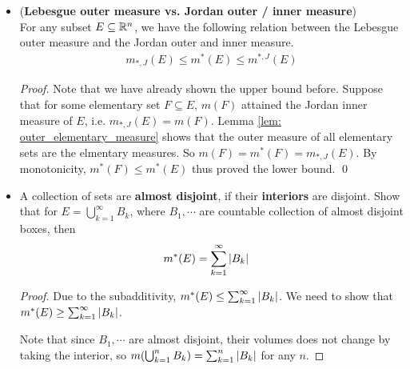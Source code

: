 \documentclass[11pt]{article}
\begin{document}
\begin{itemize}
\begin{proof}
\begin{enumerate}
By monotonicity of outer measure, we see that
\begin{align*}
m^{*}(E)&\ge m^{*}(\bigcup_{j=1}^{m}Q'_{j})\\
&\ge m(\bigcup_{j=1}^{m}Q'_{j})\\
&\ge m(E)- \epsilon, \; \forall \epsilon>0, 
\end{align*} so $m^{*}(E) \ge m(E)$. 
\end{enumerate}
This completes the whole proof. \qed.
\end{proof}

\item \begin{proposition} (\textbf{Lebesgue outer measure vs. Jordan outer / inner measure})\\
For any subset $E \subseteq {\mathbb R}^{n}$, we have the following relation between the Lebesgue outer measure and the Jordan outer and inner measure.
\begin{align*}
m_{*, J}(E) \le m^{*}(E) \le m^{*, J}(E)
\end{align*}
\end{proposition}
\begin{proof}
Note that we have already shown the upper bound before.  Suppose that for some elementary set $F \subseteq E$, $m(F)$ attained the Jordan inner measure of $E$, i.e. $m_{*, J}(E) = m(F)$.  Lemma \ref{lem: outer_elementary_measure} shows that the outer measure of all elementary sets are the elmentary measures. So $m(F) = m^{*}(F) = m_{*, J}(E)$. By monotonicity, $m^{*}(F) \le m^{*}(E)$ thus proved the lower bound. \qed
\end{proof} 

\item \begin{lemma}
A collection of sets are \textbf{almost disjoint}, if their \textbf{interiors} are disjoint. Show that for $E= \bigcup_{k=1}^{\infty}B_{k}$, where $B_{1},\cdots$ are countable collection of almost disjoint boxes, then 
\begin{align*}
m^{*}(E) &= \sum_{k=1}^{\infty}\left\lvert B_{k} \right\rvert
\end{align*}
\end{lemma}
\begin{proof}
Due to the subadditivity, $m^{*}(E) \le  \sum_{k=1}^{\infty}\left\lvert B_{k} \right\rvert$. We need to show that $m^{*}(E) \ge  \sum_{k=1}^{\infty}\left\lvert B_{k} \right\rvert$.

Note that since $B_{1},\cdots$ are almost disjoint, their volumes does not change by taking the interior, so $m(\bigcup_{k=1}^{n}B_{k}) = \sum_{k=1}^{n}\left\lvert B_{k} \right\rvert$ for any $n$. 


\end{proof}
\end{itemize}
\end{document}

